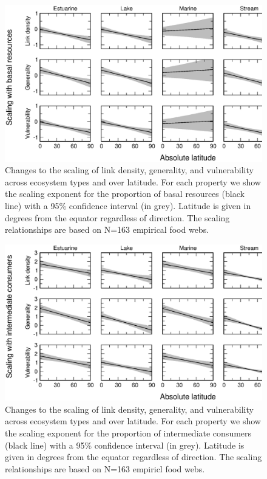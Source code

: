 \documentclass[12pt]{article}
\begin{document}
\begin{landscape}
\begin{figure}[!H]
\includegraphics[width=.85\textwidth]{Figures/by_TL/marginal/B_marginal_latitude_proportions.eps}
\caption{Changes to the scaling of link density, generality, and vulnerability across ecosystem
types and over latitude. For each property we show the scaling exponent for the proportion of
basal resources (black line) with a 95\% confidence interval (in grey). Latitude is given in degrees
from the equator regardless of direction. The scaling relationships are based on N=163 empirical food webs.}
\label{B}
\end{figure}

\newpage

\begin{figure}[h]
\includegraphics[width=.85\textwidth]{Figures/by_TL/marginal/I_marginal_latitude_proportions.eps}
\caption{Changes to the scaling of link density, generality, and vulnerability across ecosystem
types and over latitude. For each property we show the scaling exponent for the proportion of
intermediate consumers (black line) with a 95\% confidence interval (in grey). Latitude is given in degrees
from the equator regardless of direction. The scaling relationships are based on N=163 empiricl food webs.}
\label{I}
\end{figure}


\end{landscape}
\end{document}
